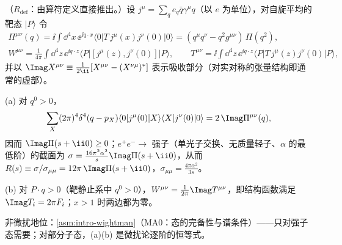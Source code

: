 \begin{proposition}\label{prop:prelim-optical}
（$R_{\mathrm{def}}$：由算符定义直接推出。）设 $j^\mu=\sum_qe_q\bar q\gamma^\mu q$（以 $e$ 为单位），对自旋平均的靶态 $|P\rangle$ 令 %
\begin{gather*}
\Pi^{\mu\nu}(q)=\ii\int\dd^4x\,\ee^{\ii q\cdot x}\langle0|T\,j^\mu(x)j^\nu(0)|0\rangle=(q^\mu q^\nu-q^2g^{\mu\nu})\,\Pi(q^2),\\
W^{\mu\nu}=\frac1{4\pi}\int\dd^4z\,\ee^{\ii q\cdot z}\langle P|[j^\mu(z),j^\nu(0)]|P\rangle,\qquad
T^{\mu\nu}=\ii\int\dd^4z\,\ee^{\ii q\cdot z}\langle P|T\,j^\mu(z)j^\nu(0)|P\rangle ,
\end{gather*}
并以 $\Imag X^{\mu\nu}\equiv\frac1{2\ii}[X^{\mu\nu}-(X^{\nu\mu})^*]$ 表示吸收部分（对实对称的张量结构即通常的虚部）。
\par
(a) 对 $q^0>0$，
\begin{equation}\label{eq:prelim-optical-vac}
\sum_X(2\pi)^4\delta^4(q-p_X)\langle0|j^\mu(0)|X\rangle\langle X|j^\nu(0)|0\rangle=2\,\Imag\Pi^{\mu\nu}(q),
\end{equation}
因而 $\Imag\Pi(s+\ii0)\ge0$；$e^+e^-\to$ 强子（单光子交换、无质量轻子、$\alpha$ 的最低阶）的截面为 $\sigma=\frac{16\pi^2\alpha^2}{s}\Imag\Pi(s+\ii0)$，从而 $R(s)\equiv\sigma/\sigma_{\mu\mu}=12\pi\,\Imag\Pi(s+\ii0)$，$\sigma_{\mu\mu}=\frac{4\pi\alpha^2}{3s}$。
\par
(b) 对 $P\cdot q>0$（靶静止系中 $q^0>0$），$W^{\mu\nu}=\frac1{2\pi}\Imag T^{\mu\nu}$，即结构函数满足 $\Imag T_i=2\pi F_i$；$x>1$ 时两边都为零。
\par
非微扰地位：\cref{asm:intro-wightman}（MA0：态的完备性与谱条件）——只对强子态需要；对部分子态，(a)(b) 是微扰论逐阶的恒等式。
\end{proposition}

